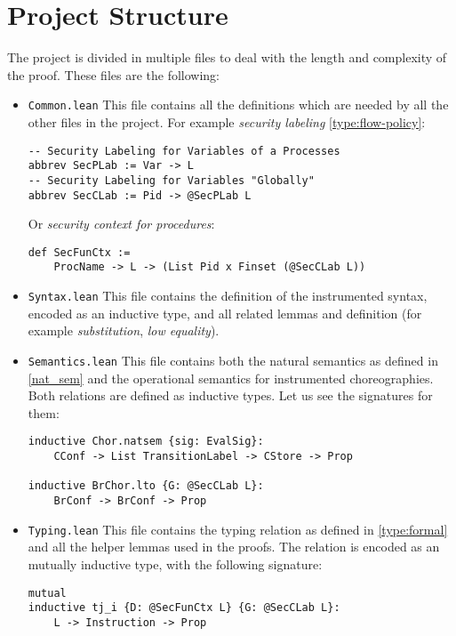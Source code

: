 \documentclass[12pt,a4paper,twoside]{book}
\begin{document}
\section{Project Structure}
The project is divided in multiple files to deal with the length and complexity of the proof. These files are the following:
\begin{itemize}
\item \texttt{Common.lean} This file contains all the definitions which are needed by all the other files in the project. For example \emph{security labeling} \ref{type:flow-policy}:
\begin{samepage}
\begin{verbatim}
-- Security Labeling for Variables of a Processes
abbrev SecPLab := Var -> L
-- Security Labeling for Variables "Globally"
abbrev SecCLab := Pid -> @SecPLab L
\end{verbatim}
\end{samepage}
Or \emph{security context for procedures}:
\begin{samepage}
\begin{verbatim}
def SecFunCtx :=
    ProcName -> L -> (List Pid x Finset (@SecCLab L))
\end{verbatim}
\end{samepage}

\item \texttt{Syntax.lean} This file contains the definition of the instrumented syntax, encoded as an inductive type, and all related lemmas and definition (for example \emph{substitution}, \emph{low equality}).

\item \texttt{Semantics.lean} This file contains both the natural semantics as defined in \ref{nat_sem} and the operational semantics for instrumented choreographies. Both relations are defined as inductive types. Let us see the signatures for them:
\begin{samepage}
\begin{verbatim}
inductive Chor.natsem {sig: EvalSig}:
    CConf -> List TransitionLabel -> CStore -> Prop

inductive BrChor.lto {G: @SecCLab L}:
    BrConf -> BrConf -> Prop
\end{verbatim}
\end{samepage}
\item \texttt{Typing.lean} This file contains the typing relation as defined in \ref{type:formal} and all the helper lemmas used in the proofs. The relation is encoded as an mutually inductive type, with the following signature:
\begin{samepage}
\begin{verbatim}
mutual
inductive tj_i {D: @SecFunCtx L} {G: @SecCLab L}:
    L -> Instruction -> Prop


\end{verbatim}
\end{samepage}
\end{itemize}
\end{document}

